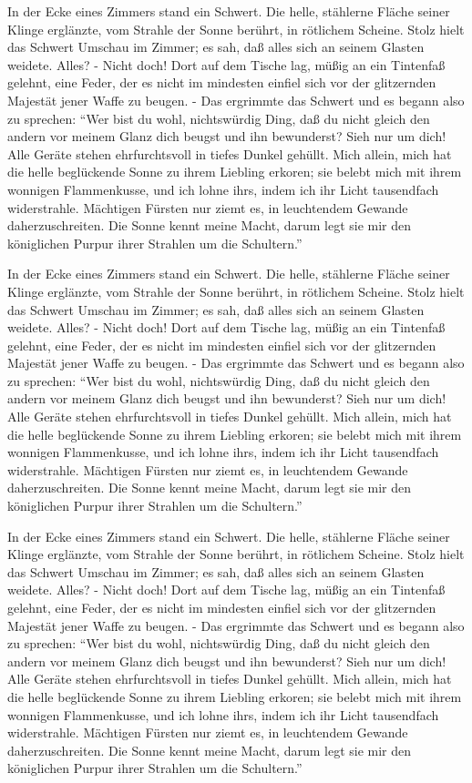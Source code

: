 In der Ecke eines Zimmers stand ein Schwert. Die helle, stählerne Fläche seiner
Klinge erglänzte, vom Strahle der Sonne berührt, in rötlichem Scheine. Stolz
hielt das Schwert Umschau im Zimmer; es sah, daß alles sich an seinem Glasten
weidete. Alles? - Nicht doch! Dort auf dem Tische \cite{btt:1998} lag, müßig an ein Tintenfaß
gelehnt, eine Feder, der es nicht im mindesten einfiel sich vor der
glitzernden Majestät jener Waffe zu beugen. - Das ergrimmte das Schwert und es
begann also zu sprechen: \enquote{Wer bist du wohl, nichtswürdig Ding, daß du nicht
gleich den andern vor meinem Glanz dich beugst und ihn bewunderst? Sieh nur
um dich! Alle Geräte stehen ehrfurchtsvoll in tiefes Dunkel gehüllt. Mich
allein, mich hat die helle beglückende Sonne zu ihrem Liebling erkoren; sie
belebt mich mit ihrem wonnigen Flammenkusse, und ich lohne ihrs, indem ich ihr
Licht tausendfach widerstrahle. Mächtigen Fürsten nur ziemt es, in leuchtendem
Gewande daherzuschreiten. Die Sonne kennt meine Macht, darum legt sie mir den
königlichen Purpur ihrer Strahlen um die Schultern.}

In der Ecke eines Zimmers stand ein Schwert. Die helle, stählerne Fläche seiner
Klinge erglänzte, vom Strahle der Sonne berührt, in rötlichem Scheine. Stolz
hielt das Schwert Umschau im Zimmer; es sah, daß alles sich an seinem Glasten
weidete. Alles? - Nicht doch! Dort auf dem Tische lag, müßig an ein Tintenfaß
gelehnt, eine Feder, der es nicht im mindesten einfiel sich vor der
glitzernden Majestät jener Waffe zu beugen. - Das ergrimmte das Schwert und es
begann also zu sprechen: \enquote{Wer bist du wohl, nichtswürdig Ding, daß du nicht
gleich den andern vor meinem Glanz dich beugst und ihn bewunderst? Sieh nur
um dich! Alle Geräte stehen ehrfurchtsvoll in tiefes Dunkel gehüllt. Mich
allein, mich hat die helle beglückende Sonne zu ihrem Liebling erkoren; sie
belebt mich mit ihrem wonnigen Flammenkusse, und ich lohne ihrs, indem ich ihr
Licht tausendfach widerstrahle. Mächtigen Fürsten nur ziemt es, in leuchtendem
Gewande daherzuschreiten. Die Sonne kennt meine Macht, darum legt sie mir den
königlichen Purpur ihrer Strahlen um die Schultern.}

In der Ecke eines Zimmers stand ein Schwert. Die helle, stählerne Fläche seiner
Klinge erglänzte, vom Strahle der Sonne berührt, in rötlichem Scheine. Stolz
hielt das Schwert Umschau im Zimmer; es sah, daß alles sich an seinem Glasten
weidete. Alles? - Nicht doch! Dort auf dem Tische lag, müßig an ein Tintenfaß
gelehnt, eine Feder, der es nicht im mindesten einfiel sich vor der
glitzernden Majestät jener Waffe zu beugen. - Das ergrimmte das Schwert und es
begann also zu sprechen: \enquote{Wer bist du wohl, nichtswürdig Ding, daß du nicht
gleich den andern vor meinem Glanz dich beugst und ihn bewunderst? Sieh nur
um dich! Alle Geräte stehen ehrfurchtsvoll in tiefes Dunkel gehüllt. Mich
allein, mich hat die helle beglückende Sonne zu ihrem Liebling erkoren; sie
belebt mich mit ihrem wonnigen Flammenkusse, und ich lohne ihrs, indem ich ihr
Licht tausendfach widerstrahle. Mächtigen Fürsten nur ziemt es, in leuchtendem
Gewande daherzuschreiten. Die Sonne kennt meine Macht, darum legt sie mir den
königlichen Purpur ihrer Strahlen um die Schultern.}

